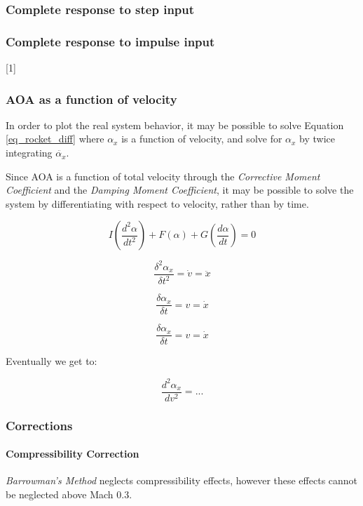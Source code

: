\documentclass[]{article}
\let\oldparagraph\paragraph
\renewcommand{\paragraph}[1]{\oldparagraph{#1}\mbox{}}
\begin{document}
\subsubsection{Complete response to step
input}\label{complete-response-to-step-input-1}

\subsubsection{Complete response to impulse
input}\label{complete-response-to-impulse-input-1}

{[}1{]}

\subsubsection{AOA as a function of
velocity}\label{aoa-as-a-function-of-velocity}

In order to plot the real system behavior, it may be possible to solve
Equation \ref{eq_rocket_diff} where \(\alpha_x\) is a function of
velocity, and solve for \(\alpha_x\) by twice integrating
\(\ddot{\alpha_x}\).

Since AOA is a function of total velocity through the \emph{Corrective
Moment Coefficient} and the \emph{Damping Moment Coefficient}, it may be
possible to solve the system by differentiating with respect to
velocity, rather than by time.

\[
I \left( \dfrac{d^2\alpha}{dt^2} \right) + F(\alpha) + G \left(\dfrac{d\alpha}{dt} \right) = 0
\]

\[
\dfrac{\delta^2 \alpha_x}{\delta t^2} = \dot{v} = \ddot{x}
\]

\[
\dfrac{\delta \alpha_x}{\delta t} = v = \dot{x}
\]

\[
\dfrac{\delta \alpha_x}{\delta t} = v = \dot{x}
\]

Eventually we get to:

\[
\dfrac{d^2\alpha_x}{dv^2} = ...
\]

\subsubsection{Corrections}\label{corrections}

\paragraph{Compressibility Correction}\label{compressibility-correction}

\emph{Barrowman's Method} neglects compressibility effects, however
these effects cannot be neglected above Mach 0.3.
\end{document}
